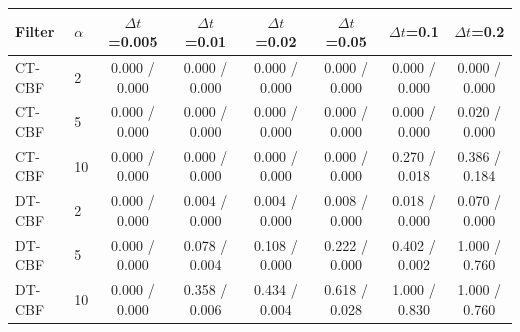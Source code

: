 \begin{tabular}{llcccccc}
\hline
Filter & $\alpha$ & $\Delta t$=0.005 & $\Delta t$=0.01 & $\Delta t$=0.02 & $\Delta t$=0.05 & $\Delta t$=0.1 & $\Delta t$=0.2 \\
\hline
CT-CBF & 2 & 0.000 / 0.000 & 0.000 / 0.000 & 0.000 / 0.000 & 0.000 / 0.000 & 0.000 / 0.000 & 0.000 / 0.000 \\
CT-CBF & 5 & 0.000 / 0.000 & 0.000 / 0.000 & 0.000 / 0.000 & 0.000 / 0.000 & 0.000 / 0.000 & 0.020 / 0.000 \\
CT-CBF & 10 & 0.000 / 0.000 & 0.000 / 0.000 & 0.000 / 0.000 & 0.000 / 0.000 & 0.270 / 0.018 & 0.386 / 0.184 \\
\hline
DT-CBF & 2 & 0.000 / 0.000 & 0.004 / 0.000 & 0.004 / 0.000 & 0.008 / 0.000 & 0.018 / 0.000 & 0.070 / 0.000 \\
DT-CBF & 5 & 0.000 / 0.000 & 0.078 / 0.004 & 0.108 / 0.000 & 0.222 / 0.000 & 0.402 / 0.002 & 1.000 / 0.760 \\
DT-CBF & 10 & 0.000 / 0.000 & 0.358 / 0.006 & 0.434 / 0.004 & 0.618 / 0.028 & 1.000 / 0.830 & 1.000 / 0.760 \\
\hline
\end{tabular}
